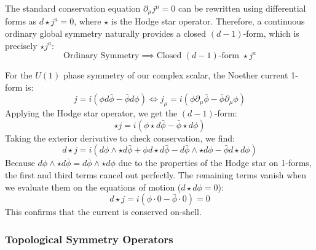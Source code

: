 \documentclass[aps,preprint,nofootinbib,preprintnumbers,eqsecnum,superscriptaddress]{revtex4}
\numberwithin{equation}{section}
\begin{document}
The standard conservation equation $\partial_\mu j^\mu = 0$ can be rewritten using differential forms as $d \star j^a = 0$, where $\star$ is the Hodge star operator. Therefore, a continuous ordinary global symmetry naturally provides a closed $(d-1)$-form, which is precisely $\star j^a$:
\begin{equation}
    \text{Ordinary Symmetry} \implies \text{Closed $(d-1)$-form } \star j^a
\end{equation}

\begin{tcolorbox}[colback=green!5!white, colframe=green!75!black, title={Example: Current conservation for the complex scalar boson}]
For the $U(1)$ phase symmetry of our complex scalar, the Noether current 1-form is:
\begin{equation}
    j = i \left( \phi d\bar{\phi} - \bar{\phi} d\phi \right) \iff j_\mu = i \left( \phi \partial_\mu \bar{\phi} - \bar{\phi} \partial_\mu \phi \right)
\end{equation}
Applying the Hodge star operator, we get the $(d-1)$-form:
\begin{equation}
    \star j = i \left( \phi \star d\bar{\phi} - \bar{\phi} \star d\phi \right)
\end{equation}
Taking the exterior derivative to check conservation, we find:
\begin{equation}
    d\star j = i \left( d\phi \wedge \star d\bar{\phi} + \phi d\star d\bar{\phi} - d\bar{\phi} \wedge \star d\phi - \bar{\phi} d\star d\phi \right)
\end{equation}
Because $d\phi \wedge \star d\bar{\phi} = d\bar{\phi} \wedge \star d\phi$ due to the properties of the Hodge star on 1-forms, the first and third terms cancel out perfectly. The remaining terms vanish when we evaluate them on the equations of motion ($d\star d\phi = 0$):
\begin{equation}
    d\star j = i \left( \phi \cdot 0 - \bar{\phi} \cdot 0 \right) = 0
\end{equation}
This confirms that the current is conserved on-shell.
\end{tcolorbox}

\subsubsection{Topological Symmetry Operators}
\end{document}
